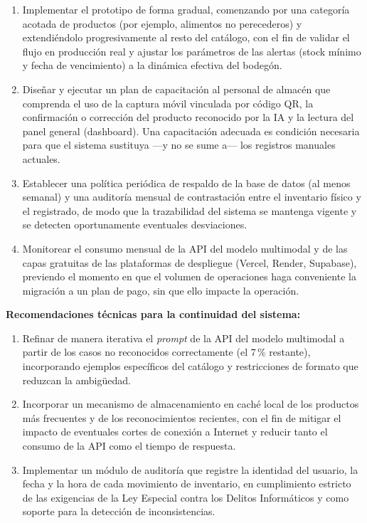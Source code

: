 \documentclass[12pt, letterpaper]{report}
\begin{document}
\begin{enumerate}[leftmargin=*]
  \item Implementar el prototipo de forma gradual, comenzando por una
        categoría acotada de productos (por ejemplo, alimentos no
        perecederos) y extendiéndolo progresivamente al resto del
        catálogo, con el fin de validar el flujo en producción real y
        ajustar los parámetros de las alertas (stock mínimo y fecha de
        vencimiento) a la dinámica efectiva del bodegón.

  \item Diseñar y ejecutar un plan de capacitación al personal de
        almacén que comprenda el uso de la captura móvil vinculada por
        código QR, la confirmación o corrección del producto
        reconocido por la IA y la lectura del panel general
        (dashboard). Una capacitación adecuada es condición necesaria
        para que el sistema sustituya ---y no se sume a--- los
        registros manuales actuales.

  \item Establecer una política periódica de respaldo de la base de
        datos (al menos semanal) y una auditoría mensual de
        contrastación entre el inventario físico y el registrado, de
        modo que la trazabilidad del sistema se mantenga vigente y se
        detecten oportunamente eventuales desviaciones.

  \item Monitorear el consumo mensual de la API del modelo multimodal
        y de las capas gratuitas de las plataformas de despliegue
        (Vercel, Render, Supabase), previendo el momento en que el
        volumen de operaciones haga conveniente la migración a un
        plan de pago, sin que ello impacte la operación.
\end{enumerate}

\textbf{Recomendaciones técnicas para la continuidad del sistema:}

\begin{enumerate}[leftmargin=*, resume]
  \item Refinar de manera iterativa el \textit{prompt} de la API del
        modelo multimodal a partir de los casos no reconocidos
        correctamente (el 7\,\% restante), incorporando ejemplos
        específicos del catálogo y restricciones de formato que
        reduzcan la ambigüedad.

  \item Incorporar un mecanismo de almacenamiento en caché local de
        los productos más frecuentes y de los reconocimientos
        recientes, con el fin de mitigar el impacto de eventuales
        cortes de conexión a Internet y reducir tanto el consumo de la
        API como el tiempo de respuesta.

  \item Implementar un módulo de auditoría que registre la identidad
        del usuario, la fecha y la hora de cada movimiento de
        inventario, en cumplimiento estricto de las exigencias de la
        Ley Especial contra los Delitos Informáticos y como soporte
        para la detección de inconsistencias.
\end{enumerate}
\end{document}
